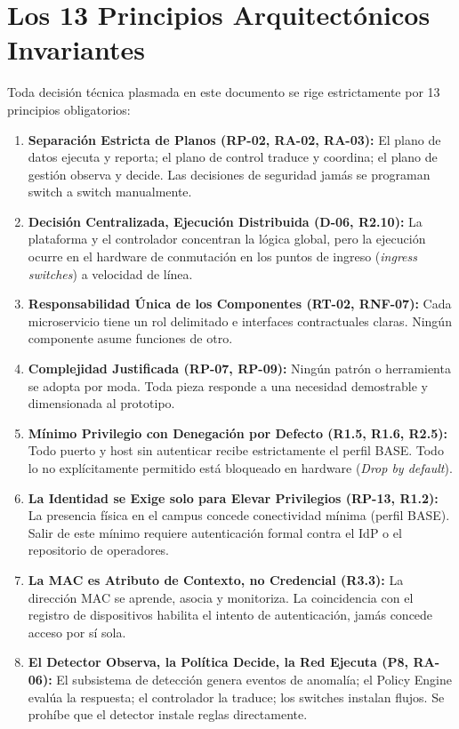 \documentclass[11pt,a4paper]{report}
\begin{document}
\section{Los 13 Principios Arquitectónicos Invariantes}
Toda decisión técnica plasmada en este documento se rige estrictamente por 13 principios obligatorios:
\begin{enumerate}[label=\textbf{P\arabic*.}, leftmargin=*]
    \item \textbf{Separación Estricta de Planos (RP-02, RA-02, RA-03):} El plano de datos ejecuta y reporta; el plano de control traduce y coordina; el plano de gestión observa y decide. Las decisiones de seguridad jamás se programan switch a switch manualmente.
    \item \textbf{Decisión Centralizada, Ejecución Distribuida (D-06, R2.10):} La plataforma y el controlador concentran la lógica global, pero la ejecución ocurre en el hardware de conmutación en los puntos de ingreso (\emph{ingress switches}) a velocidad de línea.
    \item \textbf{Responsabilidad Única de los Componentes (RT-02, RNF-07):} Cada microservicio tiene un rol delimitado e interfaces contractuales claras. Ningún componente asume funciones de otro.
    \item \textbf{Complejidad Justificada (RP-07, RP-09):} Ningún patrón o herramienta se adopta por moda. Toda pieza responde a una necesidad demostrable y dimensionada al prototipo.
    \item \textbf{Mínimo Privilegio con Denegación por Defecto (R1.5, R1.6, R2.5):} Todo puerto y host sin autenticar recibe estrictamente el perfil BASE. Todo lo no explícitamente permitido está bloqueado en hardware (\emph{Drop by default}).
    \item \textbf{La Identidad se Exige solo para Elevar Privilegios (RP-13, R1.2):} La presencia física en el campus concede conectividad mínima (perfil BASE). Salir de este mínimo requiere autenticación formal contra el IdP o el repositorio de operadores.
    \item \textbf{La MAC es Atributo de Contexto, no Credencial (R3.3):} La dirección MAC se aprende, asocia y monitoriza. La coincidencia con el registro de dispositivos habilita el intento de autenticación, jamás concede acceso por sí sola.
    \item \textbf{El Detector Observa, la Política Decide, la Red Ejecuta (P8, RA-06):} El subsistema de detección genera eventos de anomalía; el Policy Engine evalúa la respuesta; el controlador la traduce; los switches instalan flujos. Se prohíbe que el detector instale reglas directamente.

\end{enumerate}
\end{document}
